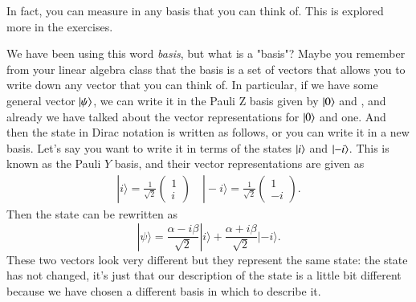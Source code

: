 In fact, you can measure in any basis that you can think of.  This is explored more in the exercises.

We have been using this word \emph{basis}, but what is a "basis"? Maybe you remember from your linear algebra class that the basis is a set of vectors that allows you to write down any vector that you can think of. In particular, if we have some general vector $\left| \psi \right\rangle$, we can write it in the Pauli Z basis given by $\left| 0 \right\rangle$ and , and already we have talked about the vector representations for $\left| 0 \right\rangle$ and one. And then the state in Dirac notation is written as follows, or you can write it in a new basis. Let's say you want to write it in terms of the states $\left| i \right\rangle$ and $\left| -i \right\rangle$. This is known as the Pauli $Y$ basis, and their vector representations are given as
\begin{align}
    |i\rangle=\frac{1}{\sqrt{2}}\left(\begin{array}{l}1 \\ i\end{array}\right) \quad|-i\rangle=\frac{1}{\sqrt{2}}\left(\begin{array}{c}1 \\ -i\end{array}\right).
\end{align}
Then the state can be rewritten as
\begin{equation}
|\psi\rangle=\frac{\alpha-i \beta}{\sqrt{2}}|i\rangle+\frac{\alpha+i \beta}{\sqrt{2}}|-i\rangle.
\end{equation}
These two vectors look very different but they represent the same state: the state has not changed, it's just that our description of the state is a little bit different because we have chosen a different basis in which to describe it.

